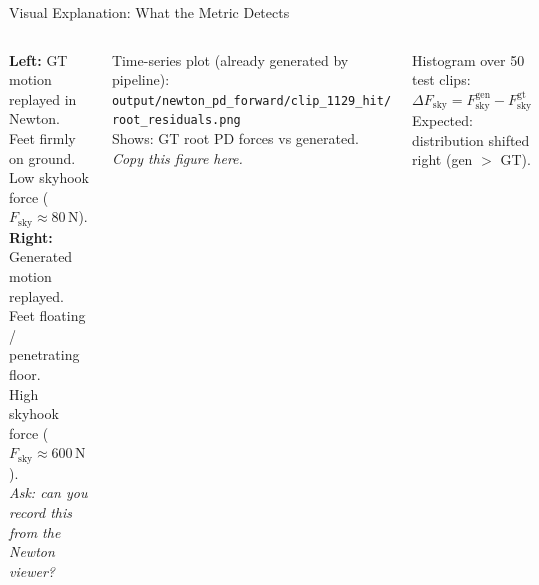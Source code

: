\documentclass[aspectratio=169, 10pt]{beamer}
\begin{document}
\begin{frame}{Visual Explanation: What the Metric Detects}
  \begin{columns}[T]
      \begin{tcolorbox}[colback=lightyellow, colframe=notegray,
                        title={\small [IMG]Figure A --- Newton viewer}]
        \small \textbf{Left:} GT motion replayed in Newton.\\
        Feet firmly on ground.\\
        Low skyhook force ($F_\text{sky} \approx 80\,\text{N}$).\\[0.4em]
        \textbf{Right:} Generated motion replayed.\\
        Feet floating / penetrating floor.\\
        High skyhook force ($F_\text{sky} \approx 600\,\text{N}$).\\[0.4em]
        \textit{Ask: can you record this from the Newton viewer?}
      \end{tcolorbox}

      \begin{tcolorbox}[colback=lightyellow, colframe=notegray,
                        title={\small [IMG]Figure B --- Force time series}]
        \small Time-series plot (already generated by pipeline):\\
        \texttt{output/newton\_pd\_forward/clip\_1129\_hit/}\\
        \texttt{root\_residuals.png}\\[0.4em]
        Shows: GT root PD forces vs generated.\\
        \textit{Copy this figure here.}
      \end{tcolorbox}

      \vspace{0.5em}
      \begin{tcolorbox}[colback=lightyellow, colframe=notegray,
                        title={\small [IMG]Figure C --- $\Delta F_\text{sky}$ histogram}]
        \small Histogram over 50 test clips:\\
        $\Delta F_\text{sky} = F_\text{sky}^\text{gen} - F_\text{sky}^\text{gt}$\\
        Expected: distribution shifted right (gen $>$ GT).
      \end{tcolorbox}
  \end{columns}
\end{frame}
\end{document}
